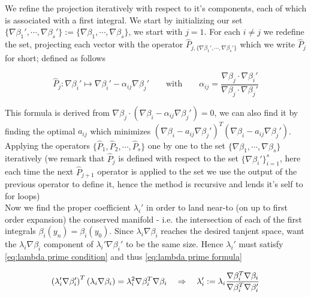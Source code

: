 \documentclass[12pt]{article}
\begin{document}
We refine the projection iteratively with respect to it's components, each of which is associated with a first integral. We start by initializing our set $\{\nabla \beta_1' ,\cdots , \nabla\beta_s'\} := \{\nabla \beta_1 ,\cdots ,\nabla \beta_s \}$, we start with $j=1$. For each $i\neq j$ we redefine the set, projecting each vector with the operator $\hat P_{j,\{\nabla\beta_1',\cdots,\nabla\beta_s'\}}$ which we write $\hat P_{j}$ for short; defined as follows

\begin{equation}\label{eq:fisrt coefficient}
    \hat P_j : \nabla\beta_i' \mapsto \nabla\beta_i' - \alpha_{ij}\nabla\beta_j' \qquad\text{with}\qquad \alpha_{ij} = \frac{\nabla\beta_j \cdot\nabla\beta_i'}{\nabla\beta_j\cdot\nabla\beta_j'} 
\end{equation}

This formula is derived from $\nabla\beta_j\cdot (\nabla\beta_i - \alpha_{ij}\nabla\beta_j')  = 0$, we can also find it by finding the optimal $a_{ij}$ which minimizes $(\nabla\beta_i - a_{ij}\nabla\beta_j')^T(\nabla\beta_i - a_{ij}\nabla\beta_j')$. \\

Applying the operators $\{\hat P_1 , \hat P_2,\cdots ,\hat P_s \}$ one by one to the set $\{\nabla\beta_1,\cdots,\nabla\beta_s\}$ iteratively (we remark that $\hat P_j$ is defined with respect to the set $\{\nabla\beta_i'\}_{i=1}^s$, here each time the next $\hat P_{j+1}$ operator is applied to the set we use the output of the previous operator to define it, hence the method is recursive and lends it's self to for loops)\\

Now we find the proper coefficient $\lambda_i'$ in order to land near-to (on up to first order expansion) the conserved manifold - i.e. the intersection of each of the first integrals $\beta_i(y_n) = \beta_i(y_0)$. Since $\lambda_i\nabla\beta_i$ reaches the desired tanjent space, want the $\lambda_i\nabla\beta_i$ component of $\lambda_i'\nabla\beta_i'$ to be the same size. Hence $\lambda_i'$ must satisfy \eqref{eq:lambda prime condition} and thus \eqref{eq:lambda prime formula}

\begin{equation}\label{eq:lambda prime condition}
    \left( \lambda_i'\nabla\beta_i' \right)^T \left( \lambda_i\nabla\beta_i \right) = \lambda_i^2 \nabla\beta_i^T\nabla\beta_i \quad\Rightarrow\quad \lambda_i' := \lambda_i \frac{\nabla\beta_i^T \nabla\beta_i}{\nabla\beta_i^T \nabla\beta_i'}
\end{equation}
\end{document}

